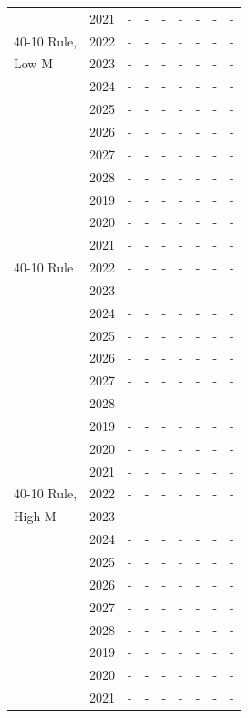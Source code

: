\documentclass[12pt,]{article}
\begin{document}
\begin{table}[ht]
{\begin{tabular}{l|cc|>{\centering}p{.7in}c|>{\centering}p{.7in}c|>{\centering}p{.7in}c}
   & 2021 & - & - & - & - & - & - & - \\ 
  40-10 Rule,  & 2022 & - & - & - & - & - & - & - \\ 
  Low M & 2023 & - & - & - & - & - & - & - \\ 
   & 2024 & - & - & - & - & - & - & - \\ 
   & 2025 & - & - & - & - & - & - & - \\ 
   & 2026 & - & - & - & - & - & - & - \\ 
   & 2027 & - & - & - & - & - & - & - \\ 
   & 2028 & - & - & - & - & - & - & - \\ 
   \hline
 & 2019 & - & - & - & - & - & - & - \\ 
   & 2020 & - & - & - & - & - & - & - \\ 
   & 2021 & - & - & - & - & - & - & - \\ 
  40-10 Rule & 2022 & - & - & - & - & - & - & - \\ 
   & 2023 & - & - & - & - & - & - & - \\ 
   & 2024 & - & - & - & - & - & - & - \\ 
   & 2025 & - & - & - & - & - & - & - \\ 
   & 2026 & - & - & - & - & - & - & - \\ 
   & 2027 & - & - & - & - & - & - & - \\ 
   & 2028 & - & - & - & - & - & - & - \\ 
   \hline
 & 2019 & - & - & - & - & - & - & - \\ 
   & 2020 & - & - & - & - & - & - & - \\ 
   & 2021 & - & - & - & - & - & - & - \\ 
  40-10 Rule, & 2022 & - & - & - & - & - & - & - \\ 
  High M & 2023 & - & - & - & - & - & - & - \\ 
   & 2024 & - & - & - & - & - & - & - \\ 
   & 2025 & - & - & - & - & - & - & - \\ 
   & 2026 & - & - & - & - & - & - & - \\ 
   & 2027 & - & - & - & - & - & - & - \\ 
   & 2028 & - & - & - & - & - & - & - \\ 
   \hline
 & 2019 & - & - & - & - & - & - & - \\ 
   & 2020 & - & - & - & - & - & - & - \\ 
   & 2021 & - & - & - & - & - & - & - \\ 

\end{tabular}}
\end{table}
\end{document}
